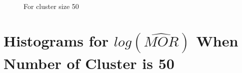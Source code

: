 \documentclass[
  letterpaper,
  DIV=11,
  numbers=noendperiod,
  titlepage]{scrartcl}
\begin{document}
\begin{figure}
\begin{minipage}[t]{0.50\linewidth}
{{}

\caption{For cluster size 50}

}

\end{minipage}%

\end{figure}

\newpage

\hypertarget{histograms-for-logwidehatmor-when-number-of-cluster-is-50}{%
\section{\texorpdfstring{Histograms for \(log(\widehat{MOR})\) When
Number of Cluster is
50}{Histograms for log(\textbackslash widehat\{MOR\}) When Number of Cluster is 50}}\label{histograms-for-logwidehatmor-when-number-of-cluster-is-50}}

\vspace{5mm}
\end{document}
